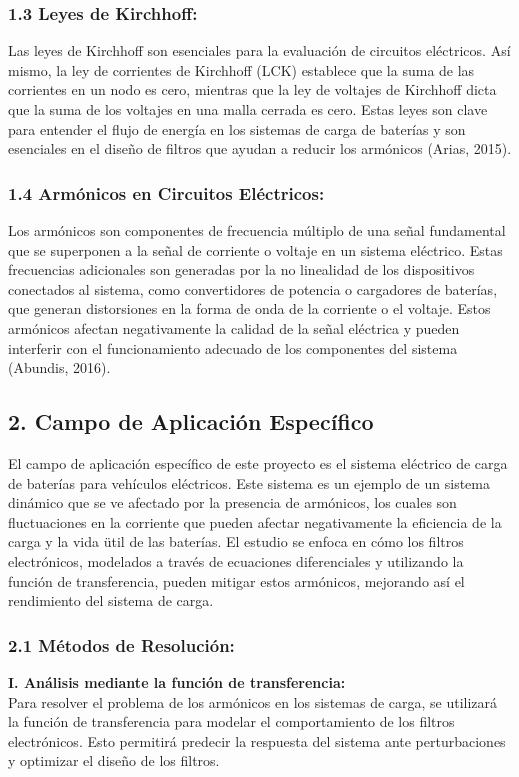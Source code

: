 \subsubsection{1.3 Leyes de Kirchhoff:}
Las leyes de Kirchhoff son esenciales para la evaluaci\'on de circuitos el\'ectricos. As\'i mismo, la ley de corrientes de Kirchhoff (LCK) establece que la suma de las corrientes en un nodo es cero, mientras que la ley de voltajes de Kirchhoff dicta que la suma de los voltajes en una malla cerrada es cero. Estas leyes son clave para entender el flujo de energ\'ia en los sistemas de carga de bater\'ias y son esenciales en el dise\~no de filtros que ayudan a reducir los arm\'onicos (Arias, 2015).

\subsubsection{1.4 Arm\'onicos en Circuitos El\'ectricos:}
Los arm\'onicos son componentes de frecuencia m\'ultiplo de una se\~nal fundamental que se superponen a la se\~nal de corriente o voltaje en un sistema el\'ectrico. Estas frecuencias adicionales son generadas por la no linealidad de los dispositivos conectados al sistema, como convertidores de potencia o cargadores de bater\'ias, que generan distorsiones en la forma de onda de la corriente o el voltaje. Estos arm\'onicos afectan negativamente la calidad de la se\~nal el\'ectrica y pueden interferir con el funcionamiento adecuado de los componentes del sistema (Abundis, 2016).

\subsection{2. Campo de Aplicaci\'on Espec\'ifico}
El campo de aplicaci\'on espec\'ifico de este proyecto es el sistema el\'ectrico de carga de bater\'ias para veh\'iculos el\'ectricos. Este sistema es un ejemplo de un sistema din\'amico que se ve afectado por la presencia de arm\'onicos, los cuales son fluctuaciones en la corriente que pueden afectar negativamente la eficiencia de la carga y la vida \"util de las bater\'ias. El estudio se enfoca en c\'omo los filtros electr\'onicos, modelados a trav\'es de ecuaciones diferenciales y utilizando la funci\'on de transferencia, pueden mitigar estos arm\'onicos, mejorando as\'i el rendimiento del sistema de carga.

\subsubsection{2.1 M\'etodos de Resoluci\'on:}
\textbf{I. An\'alisis mediante la funci\'on de transferencia:}\\
Para resolver el problema de los arm\'onicos en los sistemas de carga, se utilizar\'a la funci\'on de transferencia para modelar el comportamiento de los filtros electr\'onicos. Esto permitir\'a predecir la respuesta del sistema ante perturbaciones y optimizar el dise\~no de los filtros.
\vspace{1em}

